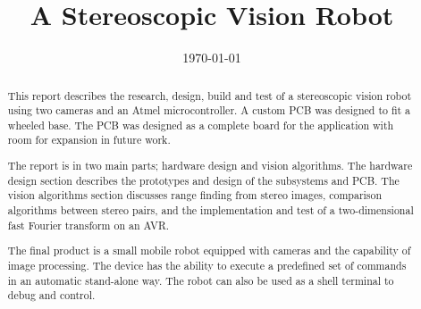 \documentclass{ecsproject}      %
\begin{document}
\frontmatter
\title      {A Stereoscopic Vision Robot}
\addresses  {\groupname\\\deptname\\\univname}
\date       {\today}
\subject    {}
\keywords   {}
\maketitle

\begin{abstract}
This report describes the research, design, build and test of a stereoscopic vision robot using two cameras and an Atmel microcontroller. A custom PCB was designed to fit a wheeled base. The PCB was designed as a complete board for the application with room for expansion in future work.

The report is in two main parts; hardware design and vision algorithms. The hardware design section describes the prototypes and design of the subsystems and PCB.
The vision algorithms section discusses range finding from stereo images, comparison algorithms between stereo pairs, and the implementation and test of a two-dimensional fast Fourier transform on an AVR. 

The final product is a small mobile robot equipped with cameras and the capability of image processing. The device has the ability to execute a predefined set of commands in an automatic stand-alone way. The robot can also be used as a shell terminal to debug and control.
\end{abstract}
\end{document}
